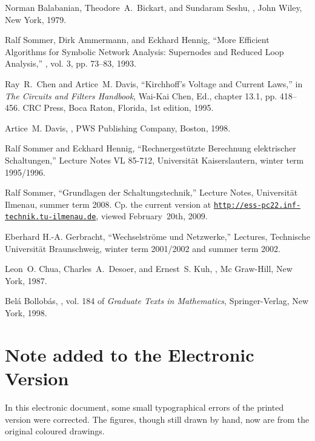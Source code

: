 \documentclass[10pt,journal,twocolumn,pagenumbers]{IEEEtran}
\begin{document}

\begin{thebibliography}{1}
{\small
{}
Norman Balabanian, Theodore~A.\ Bickart, and Sundaram Seshu,
,
\newblock John Wiley, New York, 1979.

Ralf Sommer, Dirk Ammermann, and Eckhard Hennig,
\newblock ``More {E}fficient {A}lgorithms for {S}ymbolic {N}etwork {A}nalysis:
  {S}upernodes and {R}educed {L}oop {A}nalysis,''
, vol. 3, pp.
  73--83, 1993.

Ray~R.\ Chen and Artice~M. Davis,
\newblock ``Kirchhoff's {V}oltage and {C}urrent {L}aws,''
\newblock in {\em The Circuits and Filters Handbook}, Wai-Kai Chen, Ed.,
  chapter 13.1, pp. 418--456. CRC Press, Boca Raton, Florida, 1st edition,
  1995.

Artice~M. Davis,
,
\newblock PWS Publishing Company, Boston, 1998.

Ralf Sommer and Eckhard Hennig,
\newblock ``Rechnergest\"utzte {B}erechnung elektrischer {S}chaltungen,''
\newblock Lecture Notes VL 85-712, Universit\"at Kaiserslautern, winter term 1995/1996.

Ralf Sommer,
\newblock ``Grundlagen der {S}chaltungstechnik,''
\newblock Lecture Notes, Universit\"at Ilmenau, summer term 2008.
\newblock Cp. the current version at \href{http://ess-pc22.inf-technik.tu-ilmenau.de}{\tt http://ess-pc22.inf-technik.}\linebreak\href{http://ess-pc22.inf-technik.tu-ilmenau.de}{\tt tu-ilmenau.de}, viewed February~20th, 2009.

Eberhard H.-A. Gerbracht,
\newblock ``Wechselstr\"ome und {N}etz\-werke,''
\newblock Lectures, Technische Universit\"at Braunschweig, winter term
  2001/2002 and summer term 2002.

Leon~O. Chua, Charles~A.\ Desoer, and Ernest~S. Kuh,
,
\newblock Mc Graw-Hill, New York, 1987.

Bel\'a Bollob\'as,
, vol. 184 of {\em Graduate Texts in
  Mathematics},
\newblock Springer-Verlag, New York, 1998.
}
\end{thebibliography}


\section*{Note added to the Electronic Version}
In this electronic document, some small typographical errors of the printed version were corrected. The figures, though still drawn by hand, now are from the original coloured drawings.
\end{document}
